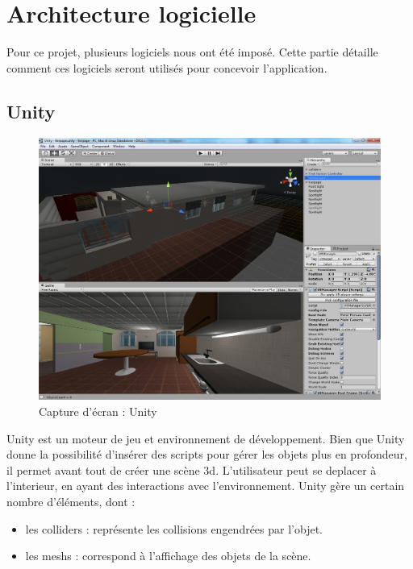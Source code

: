 \section{Architecture logicielle}
Pour ce projet, plusieurs logiciels nous ont été imposé. Cette partie détaille comment ces logiciels seront utilisés pour concevoir l'application.

\subsection{Unity}
\begin{figure}[h]
  \includegraphics[width=1\textwidth]{4-conception/img/unity_screenshot.png}
  \caption{Capture d'écran : Unity}
  \label{unity}
\end{figure}

Unity est un moteur de jeu et environnement de développement. Bien que Unity donne la possibilité d'insérer des scripts pour gérer les objets plus en profondeur, il permet avant tout de créer une scène 3d. L'utilisateur peut se deplacer à l'interieur, en ayant des interactions avec l'environnement. Unity gère un certain nombre d'éléments, dont :
\begin{itemize}
        \item les colliders : représente les collisions engendrées par l'objet.
        \item les meshs : correspond à l'affichage des objets de la scène.
\end{itemize}


